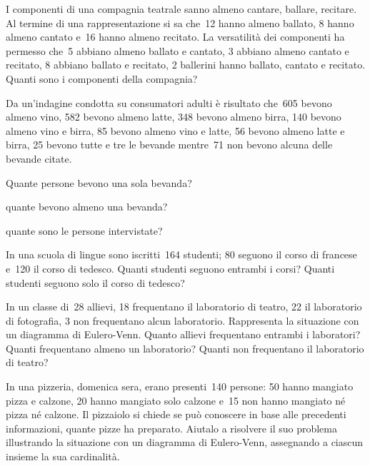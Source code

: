 \begin{multicols}{2}
\begin{esercizio}[\Ast]
\label{ese:7.28}
I componenti di una compagnia teatrale sanno almeno cantare, ballare,
recitare. Al termine di una rappresentazione si sa che~12 hanno almeno
ballato, 8 hanno almeno cantato e~16 hanno almeno recitato. La
versatilità dei componenti ha permesso che~5 abbiano almeno ballato e
cantato, 3 abbiano almeno cantato e recitato, 8 abbiano ballato e
recitato, 2 ballerini hanno ballato, cantato e recitato. Quanti sono i
componenti della compagnia?
\end{esercizio}

\begin{esercizio}[\Ast]
\label{ese:7.29}
Da un'indagine condotta su consumatori adulti è
risultato che~605 bevono almeno vino, 582 bevono almeno latte, 348
bevono almeno birra, 140 bevono almeno vino e birra, 85 bevono almeno
vino e latte, 56 bevono almeno latte e birra, 25 bevono tutte e tre le
bevande mentre~71 non bevono alcuna delle bevande citate.
\begin{enumeratea}
\item Quante persone bevono una sola bevanda?
\item quante bevono almeno una bevanda?
\item quante sono le persone intervistate?
\end{enumeratea}
\end{esercizio}

\begin{esercizio}[\Ast]
\label{ese:7.30}
In una scuola di lingue sono iscritti~164 studenti; 80 seguono il
corso di francese e~120 il corso di tedesco. Quanti studenti seguono
entrambi i corsi? Quanti studenti seguono
solo il corso di tedesco?
\end{esercizio}

\begin{esercizio}
\label{ese:7.31}
In un classe di~28 allievi, 18 frequentano il laboratorio di teatro,
22 il laboratorio di fotografia, 3 non frequentano alcun laboratorio.
Rappresenta la situazione con un diagramma di Eulero-Venn. Quanto
allievi frequentano entrambi i laboratori? Quanti frequentano almeno un
laboratorio? Quanti non frequentano il laboratorio di teatro?
\end{esercizio}


\begin{esercizio}
\label{ese:7.32}
In una pizzeria, domenica sera, erano presenti~140 persone: 50 hanno
mangiato pizza e calzone, 20 hanno mangiato solo calzone e~15 non hanno
mangiato né pizza né calzone. Il pizzaiolo si chiede se può
conoscere in base alle precedenti informazioni, quante pizze ha
preparato. Aiutalo a risolvere il suo problema illustrando la
situazione con un diagramma di Eulero-Venn, assegnando a ciascun insieme la
sua cardinalità.
\end{esercizio}



\end{multicols}
